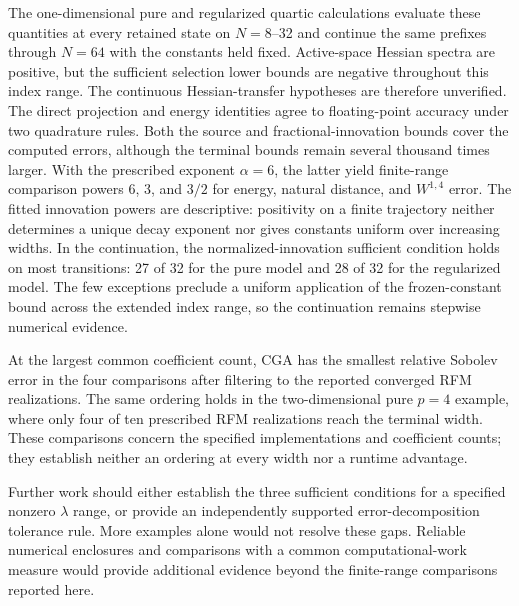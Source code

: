 The one-dimensional pure and regularized quartic calculations evaluate these quantities at
every retained state on \(N=8\)--32 and continue the same prefixes through \(N=64\) with the
constants held fixed. Active-space Hessian spectra are positive, but the
sufficient selection lower bounds are negative throughout this index range. The continuous
Hessian-transfer hypotheses are therefore unverified. The direct projection and energy
identities agree to floating-point accuracy under two quadrature rules. Both the source and
fractional-innovation bounds cover the computed errors, although the terminal bounds remain
several thousand times larger. With the prescribed exponent \(\alpha=6\), the latter yield
finite-range comparison powers \(6\), \(3\), and \(3/2\) for energy, natural distance, and
\(W^{1,4}\) error. The fitted innovation powers are descriptive: positivity on a finite
trajectory neither determines a unique decay exponent nor gives constants uniform over
increasing widths. In the continuation, the normalized-innovation sufficient condition holds
on most transitions: 27 of 32 for the pure model and 28 of 32 for the regularized model.
The few exceptions preclude a uniform application of the frozen-constant bound across the
extended index range, so the continuation remains stepwise numerical evidence.

At the largest common coefficient count, CGA has the smallest relative Sobolev error in the
four comparisons after filtering to the reported converged RFM realizations. The same ordering holds in the
two-dimensional pure \(p=4\) example, where only four of ten prescribed RFM realizations reach the terminal
width. These comparisons concern the specified implementations and coefficient counts;
they establish neither an ordering at every width nor a runtime advantage.

Further work should either establish the three sufficient conditions for a specified nonzero $\lambda$ range,
or provide an independently supported error-decomposition tolerance rule. More examples alone
would not resolve these gaps. Reliable numerical enclosures and comparisons with a common
computational-work measure would provide additional evidence beyond the finite-range comparisons
reported here.

